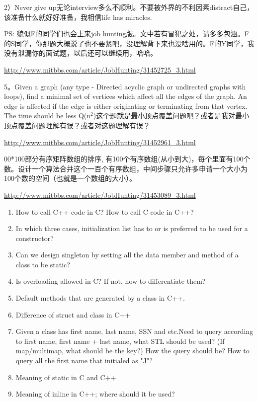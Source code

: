 \documentclass[12pt]{book}
\begin{document}
2）Never give up无论interview多么不顺利。不要被外界的不利因素distract自己，该准备什么就好好准备，我相信life has miracles.

PS: 貌似F的同学们也会上来job hunting版。文中若有冒犯之处，请多多包涵。F的S同学，你那题大概说了也不要紧吧，没理解背下来也没啥用的。F的Y同学，我没有泄漏你的面试题，以后还可以继续用，哈哈。

\url{http://www.mitbbs.com/article/JobHunting/31452725_3.html}

5。Given a graph (any type - Directed acyclic graph or undirected
graphs with loops), find a minimal set of vertices which affect all
the edges of the graph. An edge is affected if the edge is either
originating or terminating from that vertex. The time should be less Q(n$^{\text{2}}$)这个题就是最小顶点覆盖问题吧？或者是我对最小顶点覆盖问题理解有误？或者对这题理解有误？

\url{http://www.mitbbs.com/article/JobHunting/31452961_3.html}

00*100部分有序矩阵数组的排序, 有100个有序数组(从小到大)，每个里面有100个数。设计一个算法合并这个一百个有序数组，中间步骤只允许多申请一个大小为100个数的空间（也就是一个数组的大小）。

\url{http://www.mitbbs.com/article/JobHunting/31453089_3.html}

\begin{enumerate}
\item How to call C++ code in C? How to call C code in C++?

\item In which three cases, initialization list has to or is preferred to be used for a constructor?
\item Can we design singleton by setting all the data member and method of a class to be static?
\item Is overloading allowed in C? If not, how to differentiate them?
\item Default methods that are generated by a class in C++.
\item Difference of struct and class in C++
\item Given a class has first name, last name, SSN and etc.Need to query according to first name, first name + last name, what STL should be used? (If map/multimap, what should be the key?) How the query should be? How to query all the first name that initialed as "J"?
\item Meaning of static in C and C++
\item Meaning of inline in C++; where should it be used?
\end{enumerate}
\end{document}
